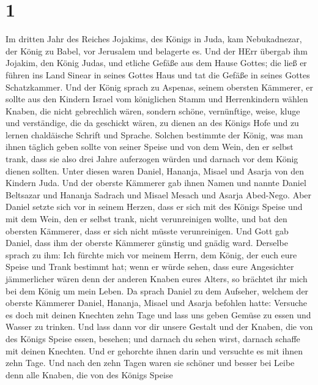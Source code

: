 \hypertarget{section}{%
\section{1}\label{section}}

 Im dritten Jahr des Reiches Jojakims, des Königs in Juda,
kam Nebukadnezar, der König zu Babel, vor Jerusalem und belagerte es.
 Und der HErr übergab ihm Jojakim, den König Judas, und
etliche Gefäße aus dem Hause Gottes; die ließ er führen ins Land Sinear
in seines Gottes Haus und tat die Gefäße in seines Gottes Schatzkammer.
 Und der König sprach zu Aspenas, seinem obersten Kämmerer,
er sollte aus den Kindern Israel vom königlichen Stamm und Herrenkindern
wählen  Knaben, die nicht gebrechlich wären, sondern schöne,
vernünftige, weise, kluge und verständige, die da geschickt wären, zu
dienen an des Königs Hofe und zu lernen chaldäische Schrift und Sprache.
 Solchen bestimmte der König, was man ihnen täglich geben
sollte von seiner Speise und von dem Wein, den er selbst trank, dass sie
also drei Jahre auferzogen würden und darnach vor dem König dienen
sollten.  Unter diesen waren Daniel, Hananja, Misael und
Asarja von den Kindern Juda.  Und der oberste Kämmerer gab
ihnen Namen und nannte Daniel Beltsazar und Hananja Sadrach und Misael
Mesach und Asarja Abed-Nego.  Aber Daniel setzte sich vor in
seinem Herzen, dass er sich mit des Königs Speise und mit dem Wein, den
er selbst trank, nicht verunreinigen wollte, und bat den obersten
Kämmerer, dass er sich nicht müsste verunreinigen.  Und Gott
gab Daniel, dass ihm der oberste Kämmerer günstig und gnädig ward.
 Derselbe sprach zu ihm: Ich fürchte mich vor meinem Herrn,
dem König, der euch eure Speise und Trank bestimmt hat; wenn er würde
sehen, dass eure Angesichter jämmerlicher wären denn der anderen Knaben
eures Alters, so brächtet ihr mich bei dem König um mein Leben.
 Da sprach Daniel zu dem Aufseher, welchem der oberste
Kämmerer Daniel, Hananja, Misael und Asarja befohlen hatte:
 Versuche es doch mit deinen Knechten zehn Tage und lass
uns geben Gemüse zu essen und Wasser zu trinken.  Und lass
dann vor dir unsere Gestalt und der Knaben, die von des Königs Speise
essen, besehen; und darnach du sehen wirst, darnach schaffe mit deinen
Knechten.  Und er gehorchte ihnen darin und versuchte es
mit ihnen zehn Tage.  Und nach den zehn Tagen waren sie
schöner und besser bei Leibe denn alle Knaben, die von des Königs Speise
